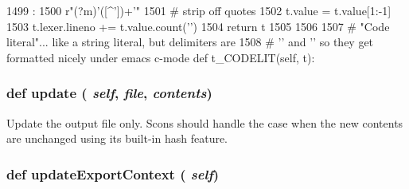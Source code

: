 \begin{DoxyCode}
1499                          :
1500         r"(?m)'([^'])+'"
1501         # strip off quotes
1502         t.value = t.value[1:-1]
1503         t.lexer.lineno += t.value.count('\n')
1504         return t
1505 
1506 
1507     # "Code literal"... like a string literal, but delimiters are
1508     # '{{' and '}}' so they get formatted nicely under emacs c-mode
    def t_CODELIT(self, t):
\end{DoxyCode}
\hypertarget{classisa__parser_1_1ISAParser_abe52b977c101e59f342489ed18140819}{
\subsubsection[{update}]{\setlength{\rightskip}{0pt plus 5cm}def update ( {\em self}, \/   {\em file}, \/   {\em contents})}}
\label{classisa__parser_1_1ISAParser_abe52b977c101e59f342489ed18140819}
\begin{DoxyVerb}Update the output file only.  Scons should handle the case when
the new contents are unchanged using its built-in hash feature.\end{DoxyVerb}
 


\hypertarget{classisa__parser_1_1ISAParser_a7fd83607e3ad062c6ead98ca8ed7ac59}{
\subsubsection[{updateExportContext}]{\setlength{\rightskip}{0pt plus 5cm}def updateExportContext ( {\em self})}}
\label{classisa__parser_1_1ISAParser_a7fd83607e3ad062c6ead98ca8ed7ac59}



